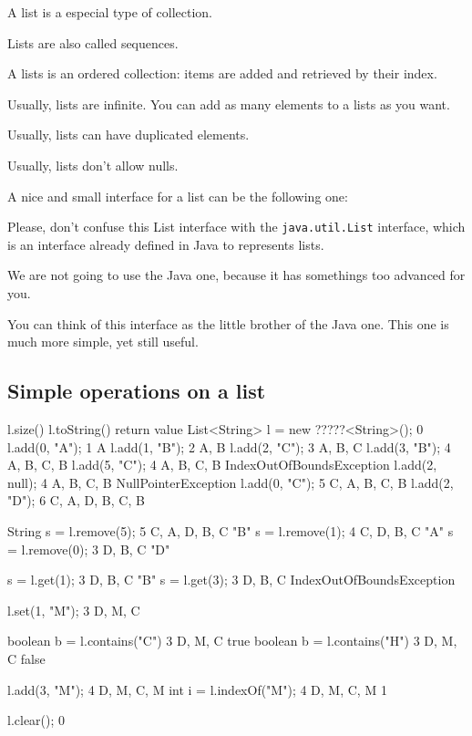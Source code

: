 \documentclass[a4paper, 9pt]{extarticle}
\begin{document}
A list is a especial type of collection.

Lists are also called sequences.

A lists is an ordered collection: items are added and retrieved by their index.

Usually, lists are infinite. You can add as many elements to a lists as you want.

Usually, lists can have duplicated elements.

Usually, lists don't allow nulls.

A nice and small interface for a list can be the following one:


Please, don't confuse this List interface with the \verb+java.util.List+
interface, which is an interface already defined in Java to represents lists.

We are not going to use the Java one, because it has somethings too advanced
for you.

You can think of this interface as the little brother of the Java one. This one
is much more simple, yet still useful.

\subsection{Simple operations on a list}

\begin{blackboard}
                         l.size()    l.toString()         return value
  List<String> l =
    new ?????<String>();        0    {}
  l.add(0, "A");                1    {A}
  l.add(1, "B");                2    {A, B}
  l.add(2, "C");                3    {A, B, C}
  l.add(3, "B");                4    {A, B, C, B}
  l.add(5, "C");                4    {A, B, C, B}         IndexOutOfBoundsException
  l.add(2, null);               4    {A, B, C, B}         NullPointerException
  l.add(0, "C");                5    {C, A, B, C, B}
  l.add(2, "D");                6    {C, A, D, B, C, B}

  String s = l.remove(5);       5    {C, A, D, B, C}     "B"
  s = l.remove(1);              4    {C, D, B, C}        "A"
  s = l.remove(0);              3    {D, B, C}           "D"

  s = l.get(1);                 3    {D, B, C}           "B"
  s = l.get(3);                 3    {D, B, C}           IndexOutOfBoundsException

  l.set(1, "M");                3    {D, M, C}

  boolean b = l.contains("C")   3    {D, M, C}           true
  boolean b = l.contains("H")   3    {D, M, C}           false

  l.add(3, "M");                4    {D, M, C, M}
  int i = l.indexOf("M");       4    {D, M, C, M}        1

  l.clear();                    0    {}
\end{blackboard}
\end{document}
